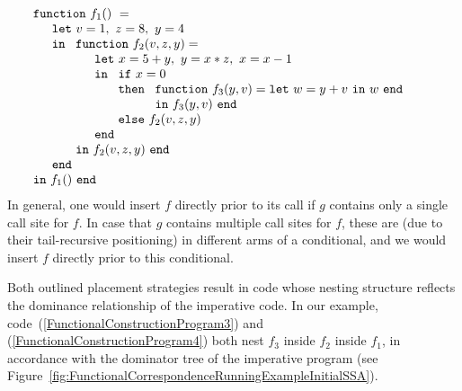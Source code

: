 \begin{equation}
\label{FunctionalConstructionProgram4}
\begin{array}{l}
\mathtt{function}\ f_1()\ = \\
  \quad
  \begin{array}{l}
     \mathtt{let}\ v = 1, \ 
                   z = 8, \ 
                   y = 4\\
     \mathtt{in}\ 
     \begin{array}[t]{l}
       \mathtt{function}\ f_2(v,z,y) =\\
         \quad
         \begin{array}{l}
           \mathtt{let}\ x = 5+y,\
                         y = x*z,\
                         x = x-1\\
           \mathtt{in}\
             \begin{array}[t]{l}
               \mathtt{if}\ x=0\\ 
               \mathtt{then}\ 
                 \begin{array}[t]{l}
                   \mathtt{function}\ f_3(y,v) = 
                   \mathtt{let}\ w = y+v\ \mathtt{in}\ w\ \mathtt{end}\\
                   \mathtt{in}\ f_3(y,v)\ \mathtt{end}
                 \end{array}\\
               \mathtt{else}\ f_2(v,z,y)
             \end{array}\\
           \mathtt{end}
         \end{array}\\
     \mathtt{in}\ f_2(v,z,y)\ \mathtt{end}
     \end{array}\\
     \mathtt{end}\\
   \end{array}\\
\mathtt{in}\ f_1()\  \mathtt{end}
\end{array}
\end{equation}
In general, one would insert $f$ directly prior to its call if $g$
contains only a single call site for $f$. In case that $g$ contains
multiple call sites for $f$, these are (due to their tail-recursive
positioning) in different arms of a conditional, and we would insert
$f$ directly prior to this conditional. 

Both outlined placement strategies result in code whose nesting
structure reflects the dominance relationship of the imperative code.
In our example, code~(\ref{FunctionalConstructionProgram3}) and
(\ref{FunctionalConstructionProgram4}) both nest $f_3$ inside $f_2$
inside $f_1$, in accordance with the dominator tree of the imperative
program (see
Figure~\ref{fig:FunctionalCorrespondenceRunningExampleInitialSSA}).

